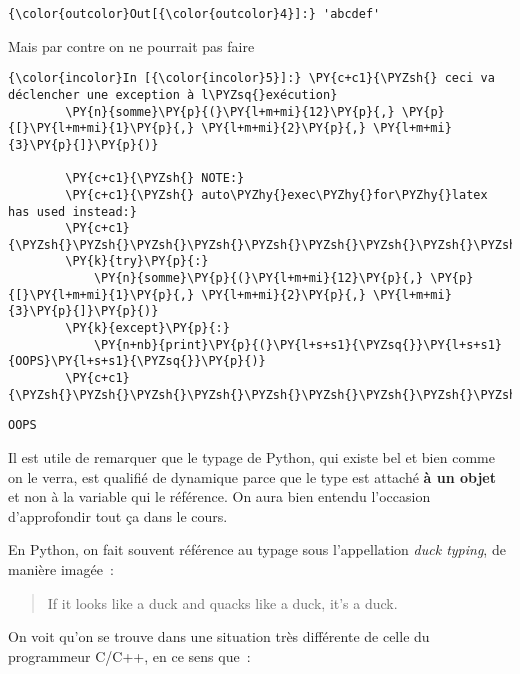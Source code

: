 \begin{Verbatim}[commandchars=\\\{\}]
{\color{outcolor}Out[{\color{outcolor}4}]:} 'abcdef'
\end{Verbatim}
            
    Mais par contre on ne pourrait pas faire

    \begin{Verbatim}[commandchars=\\\{\}]
{\color{incolor}In [{\color{incolor}5}]:} \PY{c+c1}{\PYZsh{} ceci va déclencher une exception à l\PYZsq{}exécution}
        \PY{n}{somme}\PY{p}{(}\PY{l+m+mi}{12}\PY{p}{,} \PY{p}{[}\PY{l+m+mi}{1}\PY{p}{,} \PY{l+m+mi}{2}\PY{p}{,} \PY{l+m+mi}{3}\PY{p}{]}\PY{p}{)}
        
        \PY{c+c1}{\PYZsh{} NOTE:}
        \PY{c+c1}{\PYZsh{} auto\PYZhy{}exec\PYZhy{}for\PYZhy{}latex has used instead:}
        \PY{c+c1}{\PYZsh{}\PYZsh{}\PYZsh{}\PYZsh{}\PYZsh{}\PYZsh{}\PYZsh{}\PYZsh{}\PYZsh{}\PYZsh{}}
        \PY{k}{try}\PY{p}{:}
            \PY{n}{somme}\PY{p}{(}\PY{l+m+mi}{12}\PY{p}{,} \PY{p}{[}\PY{l+m+mi}{1}\PY{p}{,} \PY{l+m+mi}{2}\PY{p}{,} \PY{l+m+mi}{3}\PY{p}{]}\PY{p}{)}
        \PY{k}{except}\PY{p}{:}
            \PY{n+nb}{print}\PY{p}{(}\PY{l+s+s1}{\PYZsq{}}\PY{l+s+s1}{OOPS}\PY{l+s+s1}{\PYZsq{}}\PY{p}{)}
        \PY{c+c1}{\PYZsh{}\PYZsh{}\PYZsh{}\PYZsh{}\PYZsh{}\PYZsh{}\PYZsh{}\PYZsh{}\PYZsh{}\PYZsh{}}
\end{Verbatim}


    \begin{Verbatim}[commandchars=\\\{\}]
OOPS

    \end{Verbatim}

    Il est utile de remarquer que le typage de Python, qui existe bel et
bien comme on le verra, est qualifié de dynamique parce que le type est
attaché \textbf{à un objet} et non à la variable qui le référence. On
aura bien entendu l'occasion d'approfondir tout ça dans le cours.

    En Python, on fait souvent référence au typage sous l'appellation
\emph{duck typing}, de manière imagée~:

\begin{quote}
If it looks like a duck and quacks like a duck, it's a duck.
\end{quote}

    On voit qu'on se trouve dans une situation très différente de celle du
programmeur C/C++, en ce sens que~:

